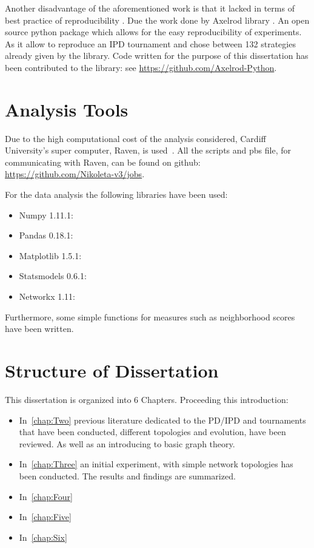Another disadvantage of the aforementioned work is that it lacked in terms of
best practice of reproducibility \cite{Axelrod1980a,Axelrod1980b,Stephens2002,Chong2004,Stewart2013}
. Due the work done by Axelrod library \cite{axelrodproject}.
An open source python package which allows for the easy
reproducibility of experiments. As it allow to reproduce an IPD tournament and
chose between 132 strategies already given by the library. Code written for the
purpose of this dissertation has been contributed to the library: see
\url{https://github.com/Axelrod-Python}.

\section{Analysis Tools}
Due to the high computational cost of the analysis considered, Cardiff
University's super computer, Raven, is used~\cite{raven}. All the scripts and pbs file, for
communicating with Raven, can be found on github:
\url{https://github.com/Nikoleta-v3/jobs}.

For the data analysis the following libraries have been used:

\begin{multicols}{2}
	\begin{itemize}
		\item Numpy 1.11.1:
		\item Pandas 0.18.1:
		\item Matplotlib 1.5.1:
		\item Statsmodels 0.6.1:
		\item Networkx 1.11:
	\end{itemize}
\end{multicols}

Furthermore, some simple functions for measures such as neighborhood scores
have been written.

\section{Structure of Dissertation}
This dissertation is organized into 6 Chapters. Proceeding this introduction:
\begin{itemize}
  \item In~\ref{chap:Two} previous literature dedicated to the PD/IPD and
        tournaments that have been conducted, different topologies and evolution,
        have been reviewed. As well as an introducing to basic graph theory.
  \item In~\ref{chap:Three} an initial experiment, with simple network topologies
        has been conducted. The results and findings are summarized.
  \item In~\ref{chap:Four}
  \item In~\ref{chap:Five}
  \item In~\ref{chap:Six}
\end{itemize}
